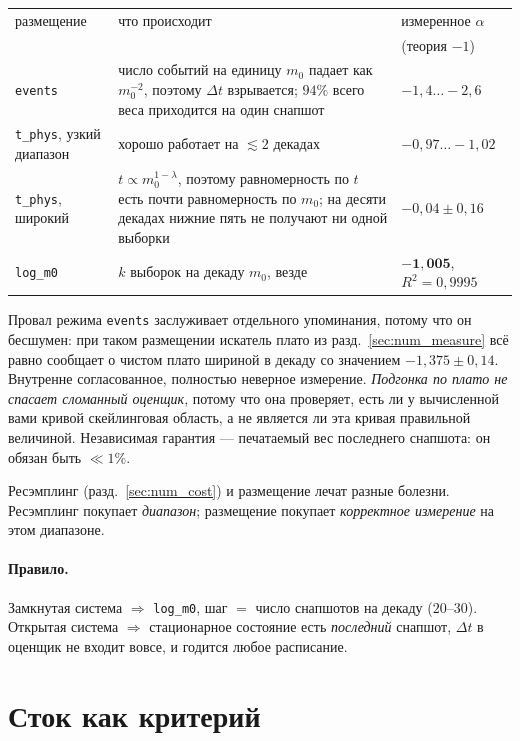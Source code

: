 \documentclass[a4paper,12pt]{article}
\newcommand{\code}[1]{\texttt{#1}}
\begin{document}
\begin{center}
\footnotesize
\begin{tabular}{@{}l p{6.6cm} l@{}}
\toprule
размещение & что происходит & измеренное $\alpha$ \\
 & & (теория $-1$) \\
\midrule
\code{events} & число событий на единицу $m_0$ падает как $m_0^{-2}$,
  поэтому $\Delta t$ взрывается; $94\%$ всего веса приходится на один
  снапшот & $-1{,}4 \ldots -2{,}6$ \\
\code{t\_phys}, узкий диапазон & хорошо работает на $\lesssim 2$ декадах
  & $-0{,}97 \ldots -1{,}02$ \\
\code{t\_phys}, широкий & $t \propto m_0^{1-\lambda}$, поэтому равномерность
  по $t$ есть почти равномерность по $m_0$; на десяти декадах нижние пять
  не получают ни одной выборки & $-0{,}04 \pm 0{,}16$ \\
\code{log\_m0} & $k$ выборок на декаду $m_0$, везде
  & $\mathbf{-1{,}005}$, $R^2 = 0{,}9995$ \\
\bottomrule
\end{tabular}
\end{center}

Провал режима \code{events} заслуживает отдельного упоминания, потому что
он бесшумен: при таком размещении искатель плато из
разд.~\ref{sec:num_measure} всё равно сообщает о чистом плато шириной в
декаду со значением $-1{,}375 \pm 0{,}14$. Внутренне согласованное,
полностью неверное измерение. \emph{Подгонка по плато не спасает сломанный
оценщик}, потому что она проверяет, есть ли у вычисленной вами кривой
скейлинговая область, а не является ли эта кривая правильной величиной.
Независимая гарантия --- печатаемый вес последнего снапшота: он обязан быть
$\ll 1\%$.

Ресэмплинг (разд.~\ref{sec:num_cost}) и размещение лечат разные болезни.
Ресэмплинг покупает \emph{диапазон}; размещение покупает \emph{корректное
измерение} на этом диапазоне.

\paragraph{Правило.} Замкнутая система $\Rightarrow$ \code{log\_m0}, шаг $=$
число снапшотов на декаду ($20$--$30$). Открытая система $\Rightarrow$
стационарное состояние есть \emph{последний} снапшот, $\Delta t$ в оценщик
не входит вовсе, и годится любое расписание.

\section{Сток как критерий}
\label{sec:num_sink}
\end{document}
